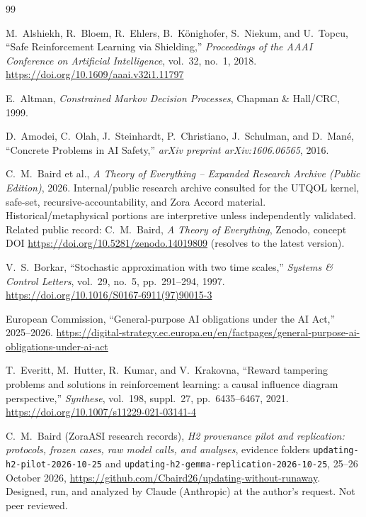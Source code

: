 \documentclass[11pt]{article}
\begin{document}
\begingroup
\raggedright
\begin{thebibliography}{99}

M.~Alshiekh, R.~Bloem, R.~Ehlers, B.~K\"onighofer, S.~Niekum, and U.~Topcu,
``Safe Reinforcement Learning via Shielding,''
\emph{Proceedings of the AAAI Conference on Artificial Intelligence}, vol.~32, no.~1, 2018.
\url{https://doi.org/10.1609/aaai.v32i1.11797}

E.~Altman,
\emph{Constrained Markov Decision Processes},
Chapman \& Hall/CRC, 1999.

D.~Amodei, C.~Olah, J.~Steinhardt, P.~Christiano, J.~Schulman, and D.~Man\'e,
``Concrete Problems in AI Safety,''
\emph{arXiv preprint arXiv:1606.06565}, 2016.

C.~M.~Baird et al.,
\emph{A Theory of Everything -- Expanded Research Archive (Public Edition)},
2026. Internal/public research archive consulted for the UTQOL kernel, safe-set, recursive-accountability, and Zora Accord material. Historical/metaphysical portions are interpretive unless independently validated. Related public record: C.~M.~Baird, \emph{A Theory of Everything}, Zenodo, concept DOI \url{https://doi.org/10.5281/zenodo.14019809} (resolves to the latest version).

V.~S.~Borkar,
``Stochastic approximation with two time scales,''
\emph{Systems \& Control Letters}, vol.~29, no.~5, pp.~291--294, 1997.
\url{https://doi.org/10.1016/S0167-6911(97)90015-3}

European Commission,
``General-purpose AI obligations under the AI Act,''
2025--2026.
\url{https://digital-strategy.ec.europa.eu/en/factpages/general-purpose-ai-obligations-under-ai-act}

T.~Everitt, M.~Hutter, R.~Kumar, and V.~Krakovna,
``Reward tampering problems and solutions in reinforcement learning: a causal influence diagram perspective,''
\emph{Synthese}, vol.~198, suppl.~27, pp.~6435--6467, 2021.
\url{https://doi.org/10.1007/s11229-021-03141-4}

C.~M.~Baird (ZoraASI research records),
\emph{H2 provenance pilot and replication: protocols, frozen cases, raw model calls, and analyses},
evidence folders \texttt{updating-h2-pilot-2026-10-25} and \texttt{updating-h2-gemma-replication-2026-10-25}, 25--26 October 2026, \url{https://github.com/Cbaird26/updating-without-runaway}. Designed, run, and analyzed by Claude (Anthropic) at the author's request. Not peer reviewed.


\end{thebibliography}
\end{document}
